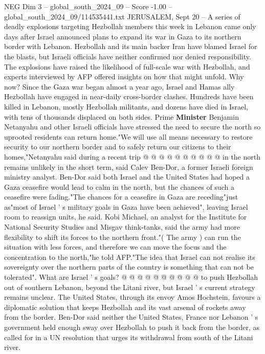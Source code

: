 \begin{textsample}{NEG Dim 3 – global\_south\_2024\_09 – Score -1.00 – global\_south\_2024\_09/114535441.txt}  \label{ex:f3_neg_127}
JERUSALEM, Sept 20 -- A series of deadly explosions targeting Hezbollah members this week in Lebanon came only days after Israel announced plans to expand its war in Gaza to its northern border with Lebanon.
Hezbollah and its main backer Iran have blamed Israel for the blasts, but Israeli officials have neither confirmed nor denied responsibility.
The explosions have raised the likelihood of full-scale war with Hezbollah, and experts interviewed by AFP offered insights on how that might unfold.
Why now?
Since the Gaza war began almost a year ago, Israel and Hamas ally Hezbollah have engaged in near-daily cross-border clashes.
Hundreds have been killed in Lebanon, mostly Hezbollah militants, and dozens have died in Israel, with tens of thousands displaced on both sides.
Prime \textbf{Minister} Benjamin Netanyahu and other Israeli officials have stressed the need to secure the north so uprooted residents can return home."We will use all means necessary to restore security to our northern border and to safely return our citizens to their homes,"Netanyahu said during a recent trip @ @ @ @ @ @ @ @ @ @ in the north remains unlikely in the short term, said Calev Ben-Dor, a former Israeli foreign ministry analyst.
Ben-Dor said both Israel and the United States had hoped a Gaza ceasefire would lead to calm in the north, but the chances of such a ceasefire were fading."The chances for a ceasefire in Gaza are receding"just as"most of Israel ' s military goals in Gaza have been achieved", leaving Israel room to reassign units, he said.
Kobi Michael, an analyst for the Institute for National Security Studies and Misgav think-tanks, said the army had more flexibility to shift its forces to the northern front."( The army ) can run the situation with less forces, and therefore we can move the focus and the concentration to the north,"he told AFP."The idea that Israel can not realise its sovereignty over the northern parts of the country is something that can not be tolerated".
What are Israel ' s goals? @ @ @ @ @ @ @ @ @ @ to push Hezbollah out of southern Lebanon, beyond the Litani river, but Israel ' s current strategy remains unclear.
The United States, through its envoy Amos Hochstein, favours a diplomatic solution that keeps Hezbollah and its vast arsenal of rockets away from the border.
Ben-Dor said neither the United States, France nor Lebanon ' s government held enough sway over Hezbollah to push it back from the border, as called for in a UN resolution that urges its withdrawal from south of the Litani river.

\end{textsample}
